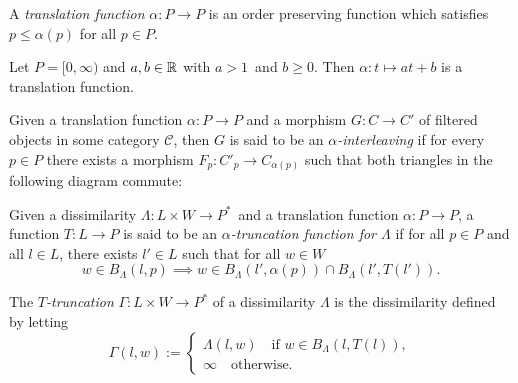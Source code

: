 \begin{defn}
	A \textit{translation function} $\alpha\colon P\to P$ is an order preserving function which satisfies $p\leq\alpha(p)$ for all $p\in P$. 
\end{defn}

\begin{ex}
	Let $P=[0,\infty)$ and $a,b\in\mathbb{R}$ with $a>1$ and $b\geq 0$. Then $\alpha\colon t\mapsto at+b$ is a translation function.
\end{ex}

\begin{defn}[Interleaving]
	Given a translation function $\alpha\colon P\to P$ and a morphism $G\colon C\to C'$ of filtered objects in some category $\mathscr{C}$, then $G$ is said to be an \textit{$\alpha$-interleaving} if for every $p\in P$ there exists a morphism $F_p\colon C'_p\to C_{\alpha(p)}$ such that both triangles in the following diagram commute:
	\begin{center}
	\end{center}
	
\end{defn}

\begin{defn}[Truncation]
Given a dissimilarity $\Lambda\colon L\times W\to P^*$ and a translation function $\alpha\colon P\to P$, a function $T\colon L\to P$ is said to be an \textit{$\alpha$-truncation function for $\Lambda$} if for all $p\in P$ and all $l\in L$, there exists $l'\in L$ such that for all $w\in W$
\begin{equation}\label{eq:truncation-function-condition}
	w\in B_\Lambda(l,p) \implies w\in B_\Lambda(l',\alpha(p))\cap B_\Lambda(l',T(l')).
\end{equation}

The \textit{$T$-truncation} $\Gamma\colon L\times W\to P^*$ of a dissimilarity $\Lambda$ is the dissimilarity defined by letting
$$
\Gamma(l,w):=\begin{cases}
	\Lambda(l,w)\quad\text{if }w\in B_\Lambda(l, T(l)),\\
	\infty\quad\text{otherwise.}
\end{cases}
$$
\end{defn}


